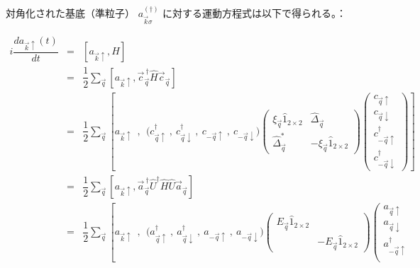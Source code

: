 \documentclass[uplatex,a4j,12pt,dvipdfmx]{jsarticle}
\begin{document}
対角化された基底（準粒子） $a_{\vec{k} \sigma}^{(\dagger)}$
に対する運動方程式は以下で得られる。：

\begin{eqnarray}
	i \dfrac{d a_{\vec{k}\uparrow}(t)}{dt}
	&=&
	\left[ a_{\vec{k}\uparrow} , H \right]
	\nonumber \\[2mm] &=&
	\dfrac{1}{2}
	\sum_{\vec{q}}
	\left[ a_{\vec{k}\uparrow} , \vec{c}_{\vec{q}}^{\ \dagger} \hat{H} \vec{c}_{\vec{q}} \right]
	\nonumber \\[2mm] &=&
	\dfrac{1}{2}
	\sum_{\vec{q}}
	\left[ a_{\vec{k}\uparrow}
		\ \ , \ \
		\big( c^{\dagger}_{\vec{q} \uparrow} \ , \ c^{\dagger}_{\vec{q} \downarrow} \ , \ c_{-\vec{q} \uparrow} \ , \ c_{-\vec{q} \downarrow}  \big)
		\!\!\!
		\left(
		\begin{array}{cc}
				\xi_{\vec{q}} \hat{1}_{2 \times 2} & \hat{\Delta}_{\vec{q}}               \\[3mm]
				\hat{\Delta}^{*}_{\vec{q}}         & - \xi_{\vec{q}} \hat{1}_{2 \times 2}
			\end{array}
		\right)
		\!\!\!
		\left(
		\begin{array}{c}
				c_{\vec{q} \uparrow}            \\[2mm]
				c_{\vec{q} \downarrow}          \\[2mm]
				c^{\dagger}_{-\vec{q} \uparrow} \\[2mm]
				c^{\dagger}_{-\vec{q} \downarrow}
			\end{array}
		\right)
		\right]
	\nonumber \\[2mm] &=&
	\dfrac{1}{2}
	\sum_{\vec{q}}
	\left[ a_{\vec{k}\uparrow} , \vec{a}_{\vec{q}}^{\ \dagger} \hat{U}^{\dagger} \hat{H} \hat{U} \vec{a}_{\vec{q}} \right]
	\nonumber \\[2mm] &=&
	\dfrac{1}{2}
	\sum_{\vec{q}}
	\left[ a_{\vec{k}\uparrow}
		\ \ , \ \
		\big( a^{\dagger}_{\vec{q} \uparrow} \ , \ a^{\dagger}_{\vec{q} \downarrow} \ , \ a_{-\vec{q} \uparrow} \ , \ a_{-\vec{q} \downarrow}  \big)
		\!\!\!
		\left(
		\begin{array}{cc}
				E_{\vec{q}} \hat{1}_{2 \times 2} &
				\\[3mm]
				                                 & - E_{\vec{q}} \hat{1}_{2 \times 2}
			\end{array}
		\right)
		\!\!\!
		\left(
		\begin{array}{c}
				a_{\vec{q} \uparrow}            \\[2mm]
				a_{\vec{q} \downarrow}          \\[2mm]
				a^{\dagger}_{-\vec{q} \uparrow} \\[2mm]

\end{array}
\end{eqnarray}
\end{document}
